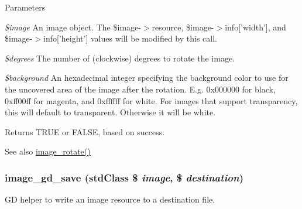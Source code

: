 \begin{DoxyParams}{Parameters}
\item[{\em \$image}]An image object. The \$image-\/$>$resource, \$image-\/$>$info\mbox{[}'width'\mbox{]}, and \$image-\/$>$info\mbox{[}'height'\mbox{]} values will be modified by this call. \item[{\em \$degrees}]The number of (clockwise) degrees to rotate the image. \item[{\em \$background}]An hexadecimal integer specifying the background color to use for the uncovered area of the image after the rotation. E.g. 0x000000 for black, 0xff00ff for magenta, and 0xffffff for white. For images that support transparency, this will default to transparent. Otherwise it will be white. \end{DoxyParams}
\begin{DoxyReturn}{Returns}
TRUE or FALSE, based on success.
\end{DoxyReturn}
\begin{DoxySeeAlso}{See also}
\hyperlink{group__image_gaccf6671cd3ed866c6463ef6ae6436dc3}{image\_\-rotate()} 
\end{DoxySeeAlso}
\hypertarget{group__image_ga840179ad0e5ef2ea7619de19cab2d225}{
\subsubsection[{image\_\-gd\_\-save}]{\setlength{\rightskip}{0pt plus 5cm}image\_\-gd\_\-save (stdClass \$ {\em image}, \/  \$ {\em destination})}}
\label{group__image_ga840179ad0e5ef2ea7619de19cab2d225}
GD helper to write an image resource to a destination file.


